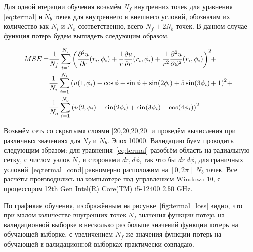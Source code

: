 \documentclass[a4paper,14pt]{extarticle} %
\begin{document}

Для одной итерации обучения возьмём $N_f$ внутренних точек для уравнения \eqref{eq:termal} и $N_b$ точек для внутреннего и внешнего условий, обозначим их количество как $N_i$ и $N_o$ соответственно, всего $N_f+2N_b$ точек. В данном случае функция потерь будем выглядеть следующим образом:

\begin{equation}\label{eq:termal_cond}
    \begin{split}
        MSE =& \frac{1}{N_f}\sum_{i=1}^{N_f} {\left( \frac{\partial^2 u}{\partial r}(r_i, \phi_i) + \frac{1}{r} \frac{\partial u}{\partial r}(r_i, \phi_i) + \frac{1}{r^2}\frac{\partial^2 u}{\partial \phi^2}(r_i, \phi_i) \right)}^2 + \\
        & \frac{1}{N_i}\sum_{i=1}^{N_i} {\left( u(1, \phi_i) - \cos\phi+\sin\phi+\sin(2\phi_i)+5\sin(3\phi_i) + 1 \right)}^2 + \\
        & \frac{1}{N_o}\sum_{i=1}^{N_o} {\left( u(2, \phi_i) - \sin (2\phi_i) +\sin(3\phi_i)+\cos(4\phi_i) \right)}^2
    \end{split}
\end{equation}

Возьмём сеть со скрытыми слоями [20,20,20,20] и проведём вычисления при различных значениях для $N_f$ и $N_b$. Эпох 10000. Валидацию буем проводить следующим образом: для уравнения~\eqref{eq:termal} разобьём область на радиальную сетку, с числом узлов $N_f$ и сторонами $dr, d\phi$, так что бы $dr~d\phi$, для граничных условий~\eqref{eq:termal_cond} равномерно расположим на $[0, 2\pi]$ $N_b$ точек. Все расчёты производились на компьютере под управлением Windows 10, с процессором 12th Gen Intel(R) Core(TM) i5-12400 2.50 GHz.

По графикам обучения, изображённым на рисунке~\ref{fig:termal_loss} видно, что при малом количестве внутренних точек $N_f$ значения функции потерь на валидационной выборке в несколько раз больше значений функции потерь на обучающей выборке, с увеличением $N_f$ же значения функции потерь на обучающей и валидационной выборках практически совпадаю.
\end{document}
